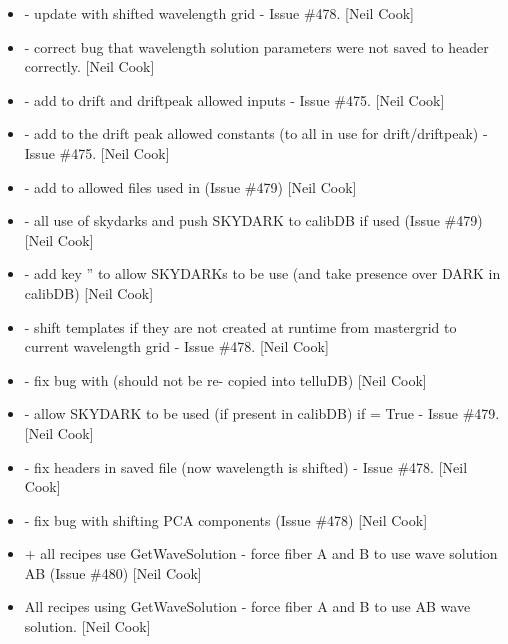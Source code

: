 \documentclass[a4paper,10pt,english]{report}
\begin{document}
\begin{itemize}
\item {} 
 - update with shifted wavelength grid - Issue
\#478. {[}Neil Cook{]}

\item {} 
 - correct bug that wavelength solution
parameters were not saved to header correctly. {[}Neil Cook{]}

\item {} 
 - add  to drift and driftpeak allowed inputs
- Issue \#475. {[}Neil Cook{]}

\item {} 
 - add  to the drift peak allowed
constants (to all in use for drift/driftpeak) - Issue \#475. {[}Neil
Cook{]}

\item {} 
 - add  to allowed files used in
 (Issue \#479) {[}Neil Cook{]}

\item {} 
 - all use of skydarks and push SKYDARK to calibDB
if used (Issue \#479) {[}Neil Cook{]}

\item {} 
 - add key ” to allow
SKYDARKs to be use (and take presence over DARK in calibDB) {[}Neil
Cook{]}

\item {} 
 - shift templates if they are not created at runtime
from mastergrid to current wavelength grid - Issue \#478. {[}Neil Cook{]}

\item {} 
 - fix bug with  (should not be re-
copied into telluDB) {[}Neil Cook{]}

\item {} 
 - allow SKYDARK to be used (if present in calibDB) if
 = True - Issue \#479. {[}Neil Cook{]}

\item {} 
 - fix headers in saved file (now wavelength is
shifted) - Issue \#478. {[}Neil Cook{]}

\item {} 
 - fix bug with shifting PCA components (Issue \#478)
{[}Neil Cook{]}

\item {} 
 + all recipes use GetWaveSolution - force fiber A and B
to use wave solution AB (Issue \#480) {[}Neil Cook{]}

\item {} 
All recipes using GetWaveSolution - force fiber A and B to use AB wave
solution. {[}Neil Cook{]}

\end{itemize}
\end{document}
